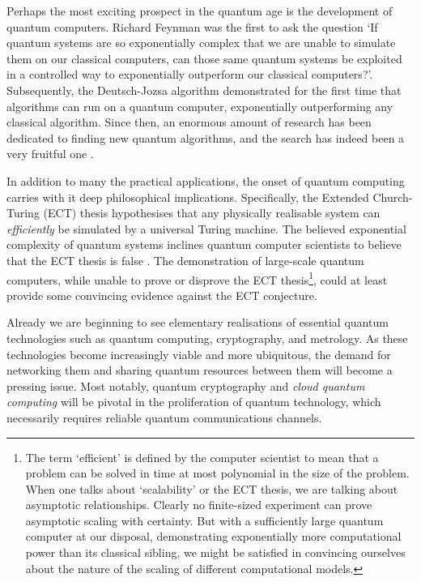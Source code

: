 \documentclass[aps,rmp,twocolumn,amsmath,amssymb,nofootinbib,superscriptaddress,longbibliography,floatfix]{revtex4-1}
\begin{document}
Perhaps the most exciting prospect in the quantum age is the development of quantum computers. Richard Feynman \cite{bib:Feynman85} was the first to ask the question `If quantum systems are so exponentially complex that we are unable to simulate them on our classical computers, can those same quantum systems be exploited in a controlled way to exponentially outperform our classical computers?'. Subsequently, the Deutsch-Jozsa algorithm \cite{bib:DeutschJozsa92} demonstrated for the first time that algorithms can run on a quantum computer, exponentially outperforming any classical algorithm. Since then, an enormous amount of research has been dedicated to finding new quantum algorithms, and the search has indeed been a very fruitful one \cite{algorithmZoo}.

In addition to many the practical applications, the onset of quantum computing carries with it deep philosophical implications. Specifically, the Extended Church-Turing (ECT) thesis hypothesises that any physically realisable system can \emph{efficiently} be simulated by a universal Turing machine. The believed exponential complexity of quantum systems inclines quantum computer scientists to believe that the ECT thesis is false \cite{bib:Deutsch85}. The demonstration of large-scale quantum computers, while unable to prove or disprove the ECT thesis\footnote{The term `efficient' is defined by the computer scientist to mean that a problem can be solved in time at most polynomial in the size of the problem. When one talks about `scalability' or the ECT thesis, we are talking about asymptotic relationships. Clearly no finite-sized experiment can prove asymptotic scaling with certainty. But with a sufficiently large quantum computer at our disposal, demonstrating exponentially more computational power than its classical sibling, we might be satisfied in convincing ourselves about the nature of the scaling of different computational models.}, could at least provide some convincing evidence against the ECT conjecture.

Already we are beginning to see elementary realisations of essential quantum technologies such as quantum computing, cryptography, and metrology. As these technologies become increasingly viable and more ubiquitous, the demand for networking them and sharing quantum resources between them will become a pressing issue. Most notably, quantum cryptography and \emph{cloud quantum computing} will be pivotal in the proliferation of quantum technology, which necessarily requires reliable quantum communications channels.
\end{document}
